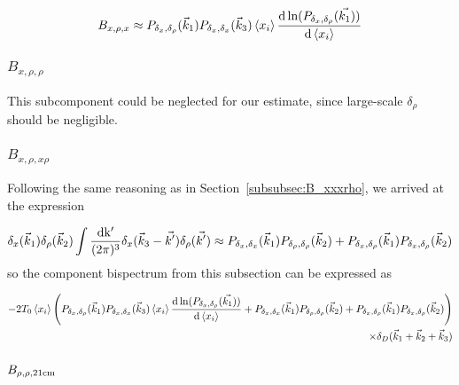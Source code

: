 \begin{equation}
B_{x,\rho,x} \approx P_{\delta_x,\delta_{\rho}}(\vec{k}_1) P_{\delta_x,\delta_x}(\vec{k}_3)\left\langle x_i \right\rangle \frac{{\rm d} \ln (P_{\delta_x,\delta_{\rho}}(\vec{k_1}))}{{\rm d}\left\langle x_i \right\rangle}
\end{equation}

\subsubsection*{$B_{x,\rho,\rho}$}
\label{subsubsec:Bxrhorho}
This subcomponent could be neglected for our estimate, since large-scale $\delta_{\rho}$ should be negligible.

\subsubsection*{$B_{x,\rho,x\rho}$}
\label{subsubsec:Bxrhoxrho}

Following the same reasoning as in Section~\ref{subsubsec:B_xxxrho}, we arrived at the expression

\begin{equation}
\delta_x(\vec{k}_1)\delta_{\rho}(\vec{k}_2) \int \frac{\rm{d}k'}{(2\pi)^3}\delta_x(\vec{k}_3-\vec{k'})\delta_{\rho}(\vec{k'})
\approx
P_{\delta_x,\delta_x}(\vec{k}_1)P_{\delta_{\rho},\delta_{\rho}}(\vec{k}_2) + P_{\delta_x,\delta_{\rho}}(\vec{k}_1)P_{\delta_x,\delta_{\rho}}(\vec{k}_2)
\end{equation}
so the component bispectrum from this subsection can be expressed as

\begin{equation}
\begin{split}
-2 T_0 \left\langle x_i \right\rangle \left( P_{\delta_x,\delta_{\rho}}(\vec{k}_1) P_{\delta_x,\delta_x}(\vec{k}_3)\left\langle x_i \right\rangle \frac{{\rm d} \ln (P_{\delta_x,\delta_{\rho}}(\vec{k_1}))}{{\rm d}\left\langle x_i \right\rangle} +  P_{\delta_x,\delta_x}(\vec{k}_1)P_{\delta_{\rho},\delta_{\rho}}(\vec{k}_2) + P_{\delta_x,\delta_{\rho}}(\vec{k}_1)P_{\delta_x,\delta_{\rho}}(\vec{k}_2) \right) \\ 
\times \delta_D(\vec{k}_1+\vec{k}_2+\vec{k}_3)
\end{split}
\end{equation}

\subsubsection{$B_{\rho,\rho,{\rm 21cm}}$}
\label{subsec:B_rhorho21}

